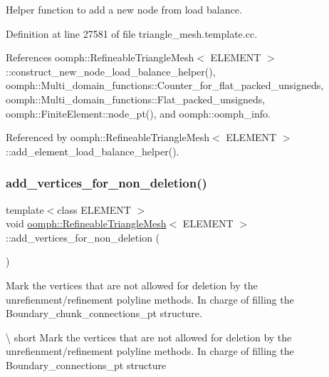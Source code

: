 Helper function to add a new node from load balance. 



Definition at line 27581 of file triangle\+\_\+mesh.\+template.\+cc.



References oomph\+::\+Refineable\+Triangle\+Mesh$<$ E\+L\+E\+M\+E\+N\+T $>$\+::construct\+\_\+new\+\_\+node\+\_\+load\+\_\+balance\+\_\+helper(), oomph\+::\+Multi\+\_\+domain\+\_\+functions\+::\+Counter\+\_\+for\+\_\+flat\+\_\+packed\+\_\+unsigneds, oomph\+::\+Multi\+\_\+domain\+\_\+functions\+::\+Flat\+\_\+packed\+\_\+unsigneds, oomph\+::\+Finite\+Element\+::node\+\_\+pt(), and oomph\+::oomph\+\_\+info.



Referenced by oomph\+::\+Refineable\+Triangle\+Mesh$<$ E\+L\+E\+M\+E\+N\+T $>$\+::add\+\_\+element\+\_\+load\+\_\+balance\+\_\+helper().

\mbox{\label{classoomph_1_1RefineableTriangleMesh_ae876bda052e22ece09c21ff531aac8d2}} 
\subsubsection{\texorpdfstring{add\+\_\+vertices\+\_\+for\+\_\+non\+\_\+deletion()}{add\_vertices\_for\_non\_deletion()}}
{\footnotesize\ttfamily template$<$class E\+L\+E\+M\+E\+NT $>$ \\
void \hyperlink{classoomph_1_1RefineableTriangleMesh}{oomph\+::\+Refineable\+Triangle\+Mesh}$<$ E\+L\+E\+M\+E\+NT $>$\+::add\+\_\+vertices\+\_\+for\+\_\+non\+\_\+deletion (\begin{DoxyParamCaption}{ }\end{DoxyParamCaption})\hspace{0.3cm}{\ttfamily [protected]}}



Mark the vertices that are not allowed for deletion by the unrefienment/refinement polyline methods. In charge of filling the Boundary\+\_\+chunk\+\_\+connections\+\_\+pt structure. 

\textbackslash{} short Mark the vertices that are not allowed for deletion by the unrefienment/refinement polyline methods. In charge of filling the Boundary\+\_\+connections\+\_\+pt structure 

